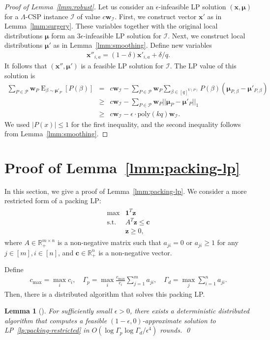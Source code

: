 \documentclass[letterpaper, 11pt]{article}
\newtheorem{lemma}[theorem]{Lemma}
\newcommand{\calI}{\mathcal{I}}
\newcommand{\calP}{\mathcal{P}}
\newcommand{\bbR}{\mathbb{R}}
\newcommand{\bic}{\boldsymbol{c}}
\newcommand{\biw}{\boldsymbol{w}}
\newcommand{\bix}{\boldsymbol{x}}
\newcommand{\biz}{\boldsymbol{z}}
\newcommand{\bimu}{\boldsymbol{\mu}}
\newcommand{\poly}{\mathrm{poly}}
\newcommand{\E}{\mathop{\mathrm{E}}}
\begin{document}
\begin{proof}[Proof of Lemma~\ref{lmm:robust}]
  Let us consider an $\epsilon$-infeasible LP solution $(\bix,\bimu)$ for a $\Lambda$-CSP instance $\calI$ of value $c\biw_{\calI}$.
  First, we construct vector $\bix'$ as in Lemma~\ref{lmm:surgery}.
  These variables together with the original local distributions $\bimu$ form an $3\epsilon$-infeasible LP solution for $\calI$.
  Next, we construct local distributions $\bimu'$ as in Lemma~\ref{lmm:smoothing}.
  Define new variables
  \begin{eqnarray*}
    \bix''_{i,a}=(1-\delta)\bix'_{i,a}+\delta/q.
  \end{eqnarray*}
  It follows that $(\bix'',\bimu')$ is a feasible LP solution for $\calI$.
  The LP value of this solution is
  \begin{eqnarray*}
    \sum_{P\in \calP}\biw_P\E_{\beta\sim \bimu'_P}[P(\beta)]
    &=&
    c\biw_{\calI}-\sum_{P\in \calP}\biw_P\sum_{\beta\in [q]^{V(P)}}P(\beta)\left(\bimu_{P,\beta}-\bimu'_{P,\beta}\right)\\
    &\geq&
    c\biw_{\calI}-\sum_{P\in \calP}\biw_P||\bimu_P-\bimu'_P||_1\\
    &\geq&
    c\biw_{\calI}-\epsilon \cdot \poly(kq) \biw_{\calI}.
  \end{eqnarray*}
  We used $|P(x)|\leq 1$ for the first inequality, and the second inequality follows from Lemma~\ref{lmm:smoothing}.
\end{proof}

\section{Proof of Lemma~\ref{lmm:packing-lp}}\label{sec:packing-lp}
In this section, we give a proof of Lemma~\ref{lmm:packing-lp}.
We consider a more restricted form of a packing LP:
\begin{eqnarray}
  \begin{array}{ll}
    \max & \mathbf{1}^T\biz \\ 
    \mbox{s.t.} & A^T\biz \leq \bic \\
    & \biz \geq 0,
  \end{array}
  \label{lp:packing-restricted}
\end{eqnarray}
where $A\in \bbR_+^{m \times n}$ is a non-negative matrix such that $a_{ji}=0$ or $a_{ji}\geq 1$ for any $j\in [m], i\in [n]$,
and $\bic\in \bbR_+^{n}$ is a non-negative vector.

Define
\begin{eqnarray*}
  c_{\max} = \max_{i}c_i, \quad
  \Gamma_p = \max_i \frac{c_{\max}}{c_i}\sum_{j=1}^m a_{ji}, \quad
  \Gamma_d = \max_j \sum_{i=1}^na_{ji}.
\end{eqnarray*}
Then, there is a distributed algorithm that solves this packing LP.
\begin{lemma}[\cite{KMW06}]\label{lmm:kmw06}
  For sufficiently small $\epsilon>0$,
  there exists a deterministic distributed algorithm that computes a feasible $(1-\epsilon,0)$-approximate solution to LP~\eqref{lp:packing-restricted} in $O(\log \Gamma_p\log \Gamma_d/\epsilon^4)$ rounds.
  \qed
\end{lemma}
\end{document}
